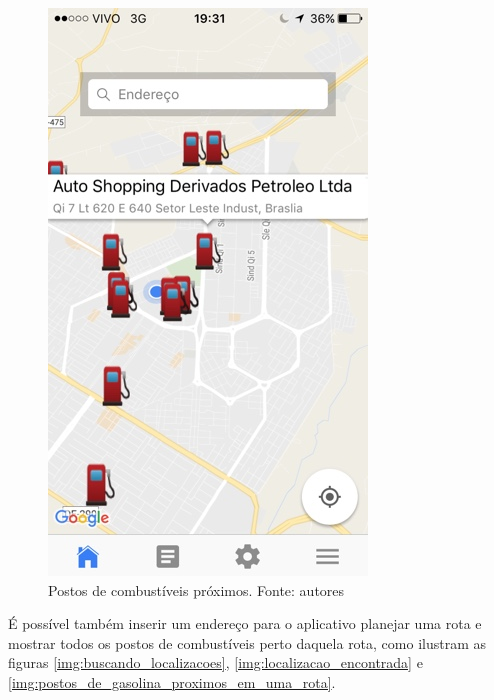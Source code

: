 \begin{figure}[H]
    \centering
    \includegraphics[scale=0.5]{figuras/app_2.jpg}
    \caption[Postos de combustíveis próximos]{Postos de combustíveis próximos. Fonte: autores}
    \label{img:postos_de_gasolina_proximos}
\end{figure}

É possível também inserir um endereço para o aplicativo planejar uma rota e mostrar todos os postos de combustíveis perto daquela rota, como ilustram as figuras \ref{img:buscando_localizacoes}, \ref{img:localizacao_encontrada} e \ref{img:postos_de_gasolina_proximos_em_uma_rota}.

